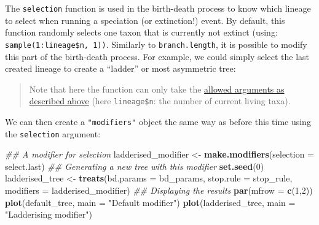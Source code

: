 \documentclass[
]{book}
\newenvironment{Shaded}{\begin{snugshade}}{\end{snugshade}}
\newcommand{\CommentTok}[1]{\textcolor[rgb]{0.56,0.35,0.01}{\textit{#1}}}
\newcommand{\ControlFlowTok}[1]{\textcolor[rgb]{0.13,0.29,0.53}{\textbf{#1}}}
\newcommand{\DataTypeTok}[1]{\textcolor[rgb]{0.13,0.29,0.53}{#1}}
\newcommand{\DecValTok}[1]{\textcolor[rgb]{0.00,0.00,0.81}{#1}}
\newcommand{\KeywordTok}[1]{\textcolor[rgb]{0.13,0.29,0.53}{\textbf{#1}}}
\newcommand{\NormalTok}[1]{#1}
\newcommand{\OperatorTok}[1]{\textcolor[rgb]{0.81,0.36,0.00}{\textbf{#1}}}
\newcommand{\StringTok}[1]{\textcolor[rgb]{0.31,0.60,0.02}{#1}}
\begin{document}
The \texttt{selection} function is used in the birth-death process to know which lineage to select when running a speciation (or extinction!) event.
By default, this function randomly selects one taxon that is currently not extinct (using: \texttt{sample(1:lineage\$n,\ 1))}.
Similarly to \texttt{branch.length}, it is possible to modify this part of the birth-death process.
For example, we could simply select the last created lineage to create a ``ladder'' or most asymmetric tree:

\begin{Shaded}
\end{Shaded}

\begin{quote}
Note that here the function can only take the \protect\hyperlink{allowarguments}{allowed arguments as described above} (here \texttt{lineage\$n}: the number of current living taxa).
\end{quote}

We can then create a \texttt{"modifiers"} object the same way as before this time using the \texttt{selection} argument:

\begin{Shaded}
\begin{Highlighting}[]
\CommentTok{\#\# A modifier for selection}
\NormalTok{ladderised\_modifier \textless{}{-}}\StringTok{ }\KeywordTok{make.modifiers}\NormalTok{(}\DataTypeTok{selection =}\NormalTok{ select.last)}
\CommentTok{\#\# Generating a new tree with this modifier}
\KeywordTok{set.seed}\NormalTok{(}\DecValTok{0}\NormalTok{)}
\NormalTok{ladderised\_tree \textless{}{-}}\StringTok{ }\KeywordTok{treats}\NormalTok{(}\DataTypeTok{bd.params =}\NormalTok{ bd\_params,}
                          \DataTypeTok{stop.rule =}\NormalTok{ stop\_rule,}
                          \DataTypeTok{modifiers =}\NormalTok{ ladderised\_modifier)}
\CommentTok{\#\# Displaying the results}
\KeywordTok{par}\NormalTok{(}\DataTypeTok{mfrow =} \KeywordTok{c}\NormalTok{(}\DecValTok{1}\NormalTok{,}\DecValTok{2}\NormalTok{))}
\KeywordTok{plot}\NormalTok{(default\_tree,    }\DataTypeTok{main =} \StringTok{"Default modifier"}\NormalTok{)}
\KeywordTok{plot}\NormalTok{(ladderised\_tree, }\DataTypeTok{main =} \StringTok{"Ladderising modifier"}\NormalTok{)}
\end{Highlighting}
\end{Shaded}
\end{document}

